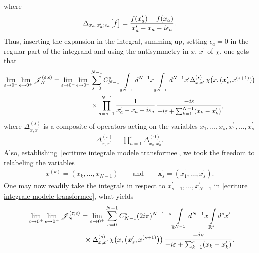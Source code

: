 \documentclass[11pt]{article}
\numberwithin{equation}{section}
\numberwithin{equation}{section}
\begin{document}
where
\begin{gather*}
\Delta_{x_a,x_a^{\prime}; \epsilon_a}\big[ f\big] = \frac{ f(x_a^{\prime})-f(x_a ) }{x^{\prime}_a-x_a-{\rm i} \epsilon_a } .
\end{gather*}
Thus, inserting the expansion in the integral, summing up, setting $\epsilon_a=0$ in the regular part of the integrand and using the
antisymmetry in $x$, $x^{\prime}$ of $\chi$, one gets that
\begin{gather}
 \lim_{\varepsilon\rightarrow 0^+} \lim_{ \epsilon \rightarrow 0^+ } \mathscr{J}_N^{(\varepsilon;\epsilon)} =
 \lim_{\varepsilon\rightarrow 0^+} \lim_{\epsilon \rightarrow 0^+ }
\sum_{s=0}^{N-1} C^{s}_{N-1}
 \int\limits_{\mathbb{R}^{N-1}}{} {\rm d}^{N-1}x \int\limits_{\mathbb{R}^{N-1}}{} {\rm d}^{N-1}x^{\prime} \Delta^{(s)}_{x,x^{\prime} } \,
\chi\big( x,(\boldsymbol{x}_s^{\prime},x^{(s+1)})\big) \nonumber
\\ \hphantom{ \lim_{\varepsilon\rightarrow 0^+} \lim_{ \epsilon \rightarrow 0^+ } \mathscr{J}_N^{(\varepsilon;\epsilon)} =}
\times \prod\limits_{a=s+1}^{N-1} \frac{1}{x^{\prime}_a-x_a-{\rm i} \varepsilon_a }
\, \frac{-{\rm i} \varepsilon }{-{\rm i} \varepsilon + \sum_{k=1}^{N-1}(x_k - x_k^{\prime}) },
\label{ecriture integrale modele transformee}
\end{gather}
where $\Delta^{(s)}_{x,x^{\prime} }$ is a composite of operators acting on the variables $x_1,\dots, x_s, x_1^{\prime},\dots,
x_{s}^{\prime}$
\begin{gather*}
\Delta^{(s)}_{x,x^{\prime} } = \prod\limits_{a=1}^{s} \Delta_{x_a,x_a^{\prime}}^{(0)} .
\end{gather*}
Also, establishing~\eqref{ecriture integrale modele transformee}, we took the freedom to relabeling the variables %
\begin{gather*}
x^{(k)} = (x_k,\dots, x_{N-1 } ) \qquad \text{and} \qquad \boldsymbol{x}_s^{\prime} =(x_1^{\prime},\dots, x_{s}^{\prime}).
\end{gather*}
One may now readily take the integrals in respect to $x^{\prime}_{s+1},\dots, x^{\prime}_{N-1}$ in \eqref{ecriture integrale modele
transformee}, what yields
\begin{gather*}
\lim_{\varepsilon\rightarrow 0^+} \lim_{\epsilon \rightarrow 0^+ }
 \mathscr{J}_N^{(\varepsilon;\epsilon)} = \lim_{\varepsilon\rightarrow 0^+}
\sum_{s=0}^{N-1} C^{s}_{N-1} (2 {\rm i}\pi)^{N-1-s}
\int\limits_{\mathbb{R}^{N-1}}{} {\rm d}^{N-1}x \int\limits_{\mathbb{R}^{s}}{} {\rm d}^{s}x^{\prime}
\\ \hphantom{\lim_{\varepsilon\rightarrow 0^+} \lim_{\epsilon \rightarrow 0^+ }
 \mathscr{J}_N^{(\varepsilon;\epsilon)} =}
\times \Delta^{(s)}_{x,x^{\prime} } \, \chi\big( x,\big(\boldsymbol{x}_s^{\prime},x^{(s+1)}\big)\big)
\, \frac{-{\rm i} \varepsilon }{-{\rm i} \varepsilon + \sum_{k=1}^{s}(x_k - x_k^{\prime}) }.
\end{gather*}
\end{document}

